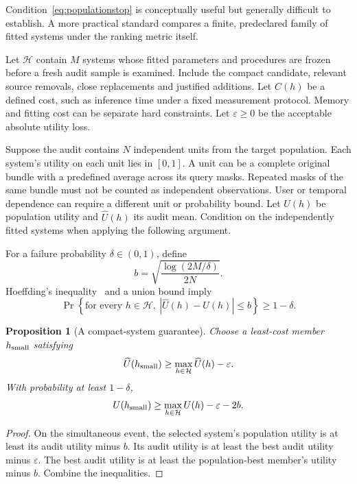 \documentclass[11pt,a4paper]{article}
\newtheorem{proposition}{Proposition}
\begin{document}
Condition~\eqref{eq:populationstop} is conceptually useful but generally
difficult to establish. A more practical standard compares a finite,
predeclared family of fitted systems under the ranking metric itself.

Let $\mathcal H$ contain $M$ systems whose fitted parameters and procedures
are frozen before a fresh audit sample is examined. Include the compact
candidate, relevant source removals, close replacements and justified
additions. Let $C(h)$ be a defined cost, such as inference time under a fixed
measurement protocol. Memory and fitting cost can be separate hard
constraints. Let $\varepsilon\geq0$ be the acceptable absolute utility loss.

Suppose the audit contains $N$ independent units from the target population.
Each system's utility on each unit lies in $[0,1]$. A unit can be a complete
original bundle with a predefined average across its query masks. Repeated
masks of the same bundle must not be counted as independent observations.
User or temporal dependence can require a different unit or probability
bound. Let $U(h)$ be population utility and $\widehat U(h)$ its audit mean.
Condition on the independently fitted systems when applying the following
argument.

For a failure probability $\delta\in(0,1)$, define
\begin{equation}
 b=\sqrt{\frac{\log(2M/\delta)}{2N}}.
 \label{eq:hoeffding}
\end{equation}
Hoeffding's inequality~\cite{hoeffding1963} and a union bound imply
\begin{equation}
 \Pr\left\{\text{for every }h\in\mathcal H,
       \ |\widehat U(h)-U(h)|\leq b\right\}\geq1-\delta.
\end{equation}

\begin{proposition}[A compact-system guarantee]
Choose a least-cost member $h_{\rm small}$ satisfying
\begin{equation}
 \widehat U(h_{\rm small})\geq
       \max_{h\in\mathcal H}\widehat U(h)-\varepsilon.
\end{equation}
With probability at least $1-\delta$,
\begin{equation}
 U(h_{\rm small})\geq
       \max_{h\in\mathcal H}U(h)-\varepsilon-2b.
 \label{eq:certificate}
\end{equation}
\end{proposition}
\begin{proof}
On the simultaneous event, the selected system's population utility is at
least its audit utility minus $b$. Its audit utility is at least the best
audit utility minus $\varepsilon$. The best audit utility is at least the
population-best member's utility minus $b$. Combine the inequalities.
\end{proof}
\end{document}
